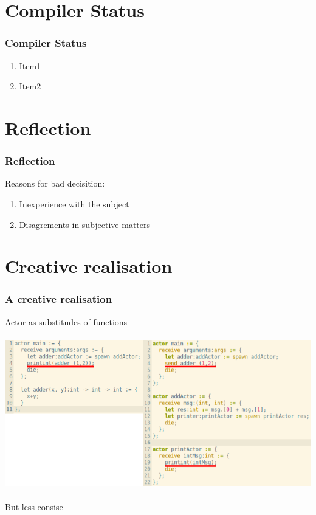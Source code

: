 \section{Compiler Status}
\begin{frame}
	\frametitle{Compiler Status}
	 \begin{enumerate}
    \item Item1
    \item Item2
  \end{enumerate}
\end{frame}

\section{Reflection}
\begin{frame}
	\frametitle{Reflection}
	Reasons for bad decisition:
	\begin{enumerate}
    \item Inexperience with the subject
    \item Disagrements in subjective matters
  \end{enumerate}
\end{frame}

\section{Creative realisation}
\begin{frame}
	\frametitle{A creative realisation}
	Actor as substitudes of functions
	\\\\
	\includegraphics[width=\textwidth]{Images/actorFunc.png}
	\\\\
	But less consise
\end{frame}

